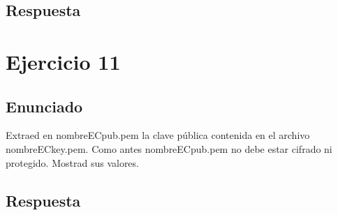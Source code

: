\documentclass[10pt,a4paper,spanish]{report}
\begin{document}
\section{Respuesta}
\noindent


\chapter{Ejercicio 11}

\section{Enunciado}
\noindent
Extraed en nombreECpub.pem la clave pública contenida en el archivo nombreECkey.pem. Como antes nombreECpub.pem no debe estar cifrado ni protegido. Mostrad sus valores.

\section{Respuesta}
\noindent

\end{document}
